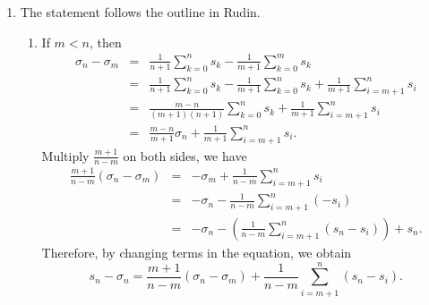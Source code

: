 \documentclass[a4paper]{article}
\theoremstyle{plain}
\begin{document}
\begin{enumerate}[label = (\alph*)]
    \item The statement follows the outline in Rudin.
        \begin{enumerate}[label = (\roman*)]
            \item If $m < n$, then
                \[
                    \begin{array}{RCL}
                        \sigma_n - \sigma_m & = & \frac{1}{n+1}\sum^n_{k=0}s_k
                        - \frac{1}{m+1}\sum^m_{k=0}s_k \\[4mm]
                        & = & \frac{1}{n+1}\sum^n_{k=0}s_k - \frac{1}{m+1}\sum^n_{k=0}s_k
                        + \frac{1}{m+1}\sum^n_{i=m+1}s_i \\[4mm]
                        & = & \frac{m-n}{(m+1)(n+1)}\sum^n_{k=0}s_k 
                        + \frac{1}{m+1}\sum^n_{i=m+1}s_i \\[4mm]
                        & = & \frac{m-n}{m+1}\sigma_n + \frac{1}{m+1}\sum^n_{i=m+1}s_i.
                    \end{array}
                \]
                Multiply $\frac{m+1}{n-m}$ on both sides, we have
                \[
                    \begin{array}{RCL}
                        \frac{m+1}{n-m}(\sigma_n - \sigma_m) & = & -\sigma_m
                        + \frac{1}{n-m}\sum^n_{i=m+1}s_i \\[4mm]
                        & = & -\sigma_n - \frac{1}{n-m}\sum^n_{i=m+1}(-s_i) \\[4mm]
                        & = & -\sigma_n - \left(\frac{1}{n-m}\sum^n_{i=m+1}(s_n-s_i)\right)
                        + s_n.
                    \end{array}
                \]
                Therefore, by changing terms in the equation, we obtain
                \[
                    s_n - \sigma_n = \frac{m+1}{n-m}(\sigma_n-\sigma_m)
                    + \frac{1}{n-m}\sum^n_{i=m+1}(s_n-s_i).
                \]


\end{enumerate}
\end{enumerate}
\end{document}
